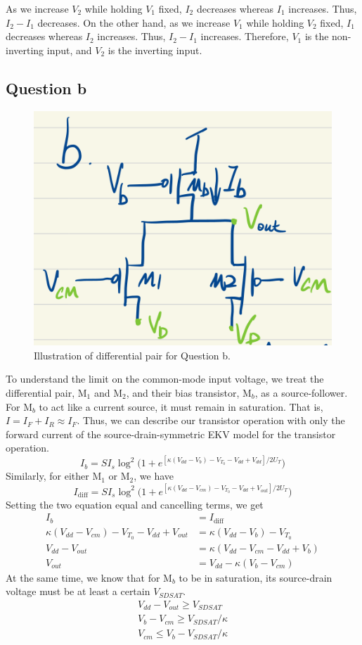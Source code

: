 \documentclass[11pt]{article}
\begin{document}
        As we increase $V_2$ while holding $V_1$ fixed, $I_2$ decreases whereas $I_1$ increases. Thus, $I_2-I_1$ decreases. On the other hand, as we increase $V_1$ while holding $V_2$ fixed, $I_1$ decreases whereas $I_2$ increases. Thus, $I_2-I_1$ increases. Therefore, $V_1$ is the non-inverting input, and $V_2$ is the inverting input. 
    \subsection{Question b}
        \begin{figure}[!ht]
            \centering
            \includegraphics[width=.5\linewidth]{../img/qb.png}
            \caption{Illustration of differential pair for Question b.}
            \label{fig:qb}
        \end{figure}
    To understand the limit on the common-mode input voltage, we treat the differential pair, M$_1$ and M$_2$, and their bias transistor, M$_b$, as a source-follower. For M$_b$ to act like a current source, it must remain in saturation. That is, $I=I_F+I_R\approx I_F$. Thus, we can describe our transistor operation with only the forward current of the source-drain-symmetric EKV model for the transistor operation.
    \begin{equation}
        I_b = SI_s\log^2\Big(1+e^{[\kappa(V_{dd}-V_b)-V_{T_0}-V_{dd}+V_{dd}]/2U_T}\Big)
    \end{equation}
    Similarly, for either M$_1$ or M$_2$, we have
    \begin{equation}
        I_{\text{diff}} = SI_s\log^2\Big(1+e^{[\kappa(V_{dd}-V_{cm})-V_{T_0}-V_{dd}+V_{out}]/2U_T}\Big)
    \end{equation}
    Setting the two equation equal and cancelling terms, we get
    \begin{align}
        I_b&=I_{\text{diff}}\nonumber\\
        \kappa(V_{dd}-V_{cm})-V_{T_0}-V_{dd}+V_{out}&=\kappa(V_{dd}-V_b)-V_{T_0}\nonumber\\
        V_{dd}-V_{out}&=\kappa(V_{dd}-V_{cm}-V_{dd}+V_b)\nonumber\\
        V_{out} &= V_{dd} - \kappa(V_b-V_{cm})
    \end{align}
    At the same time, we know that for M$_b$ to be in saturation, its source-drain voltage must be at least a certain $V_{SDSAT}$.
    \begin{align}
        V_{dd} - V_{out} \geq V_{SDSAT}\nonumber\\
        V_b - V_{cm} \geq V_{SDSAT}/\kappa\nonumber\\
        V_{cm} \leq V_b - V_{SDSAT}/\kappa
    \end{align}
    
\end{document}
